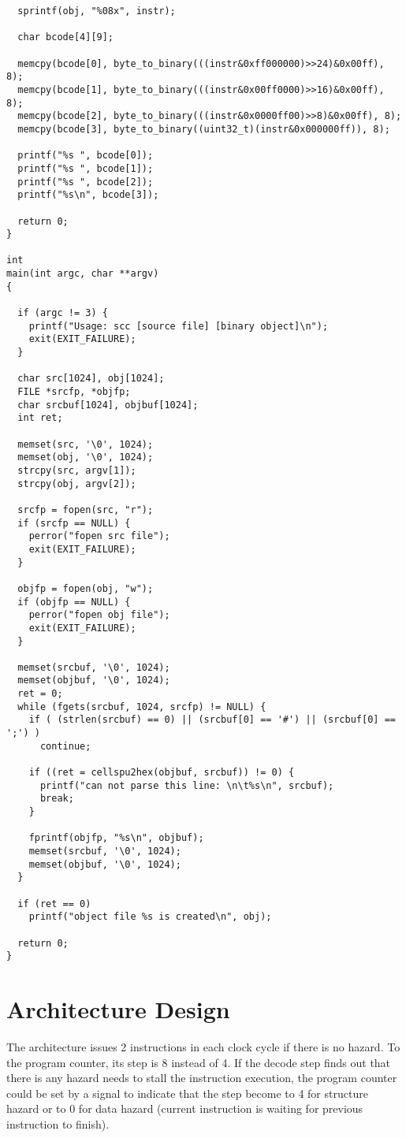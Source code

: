 \documentclass[preprint,authoryear,12pt]{elsarticle}
\begin{document}
\begin{verbatim}
  sprintf(obj, "%08x", instr);

  char bcode[4][9];

  memcpy(bcode[0], byte_to_binary(((instr&0xff000000)>>24)&0x00ff), 8);
  memcpy(bcode[1], byte_to_binary(((instr&0x00ff0000)>>16)&0x00ff), 8);
  memcpy(bcode[2], byte_to_binary(((instr&0x0000ff00)>>8)&0x00ff), 8);
  memcpy(bcode[3], byte_to_binary((uint32_t)(instr&0x000000ff)), 8);

  printf("%s ", bcode[0]);
  printf("%s ", bcode[1]);
  printf("%s ", bcode[2]);
  printf("%s\n", bcode[3]);

  return 0;
}

int
main(int argc, char **argv)
{

  if (argc != 3) {
    printf("Usage: scc [source file] [binary object]\n");
    exit(EXIT_FAILURE);
  }

  char src[1024], obj[1024];
  FILE *srcfp, *objfp;
  char srcbuf[1024], objbuf[1024];
  int ret;

  memset(src, '\0', 1024);
  memset(obj, '\0', 1024);
  strcpy(src, argv[1]);
  strcpy(obj, argv[2]);

  srcfp = fopen(src, "r");
  if (srcfp == NULL) {
    perror("fopen src file");
    exit(EXIT_FAILURE);
  }

  objfp = fopen(obj, "w");
  if (objfp == NULL) {
    perror("fopen obj file");
    exit(EXIT_FAILURE);
  }

  memset(srcbuf, '\0', 1024);
  memset(objbuf, '\0', 1024);
  ret = 0;
  while (fgets(srcbuf, 1024, srcfp) != NULL) {
    if ( (strlen(srcbuf) == 0) || (srcbuf[0] == '#') || (srcbuf[0] == ';') )
      continue;

    if ((ret = cellspu2hex(objbuf, srcbuf)) != 0) {
      printf("can not parse this line: \n\t%s\n", srcbuf);
      break;
    }

    fprintf(objfp, "%s\n", objbuf);
    memset(srcbuf, '\0', 1024);
    memset(objbuf, '\0', 1024);
  }

  if (ret == 0)
    printf("object file %s is created\n", obj);

  return 0;
}

\end{verbatim}


\section{Architecture Design}\label{sec:design}

The architecture issues 2 instructions in each clock cycle if there is
no hazard. To the program counter, its step is 8 instead of 4. If the
decode step finds out that there is any hazard needs to stall the
instruction execution, the program counter could be set by a signal to
indicate that the step become to 4 for structure hazard or to 0 for
data hazard (current instruction is waiting for previous instruction
to finish).
\end{document}
